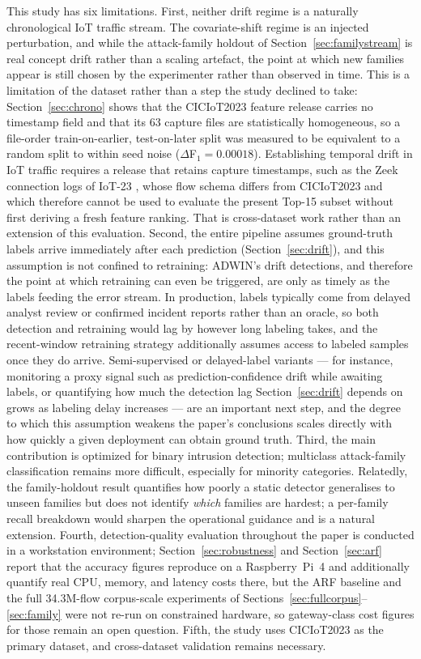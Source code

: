 \documentclass[11pt,a4paper]{article}
\begin{document}
This study has six limitations. First, neither drift regime is a naturally
chronological IoT traffic stream. The covariate-shift regime is an injected
perturbation, and while the attack-family holdout of
Section~\ref{sec:familystream} is real concept drift rather than a scaling
artefact, the point at which new families appear is still chosen by the
experimenter rather than observed in time. This is a limitation of the dataset
rather than a step the study declined to take:
Section~\ref{sec:chrono} shows that the CICIoT2023 feature release carries no
timestamp field and that its 63 capture files are statistically homogeneous, so
a file-order train-on-earlier, test-on-later split was measured to be
equivalent to a random split to within seed noise
($\Delta$F$_1 = 0.00018$). Establishing temporal drift in IoT traffic requires
a release that retains capture timestamps, such as the Zeek connection logs of
IoT-23 \cite{garcia2020iot23}, whose flow schema differs from CICIoT2023 and
which therefore cannot be used to evaluate the present Top-15 subset without
first deriving a fresh feature ranking. That is cross-dataset work rather than
an extension of this evaluation. Second, the entire pipeline assumes
ground-truth labels arrive immediately after each prediction
(Section~\ref{sec:drift}), and this assumption is not confined to
retraining: ADWIN's drift detections, and therefore the point at which
retraining can even be triggered, are only as timely as the labels
feeding the error stream. In production, labels typically come from
delayed analyst review or confirmed incident reports rather than an
oracle, so both detection and retraining would lag by however long
labeling takes, and the recent-window retraining strategy additionally
assumes access to labeled samples once they do arrive. Semi-supervised
or delayed-label variants --- for instance, monitoring a proxy signal
such as prediction-confidence drift while awaiting labels, or
quantifying how much the detection lag Section~\ref{sec:drift} depends
on grows as labeling delay increases --- are an important next step,
and the degree to which this assumption weakens the paper's
conclusions scales directly with how quickly a given deployment can
obtain ground truth.
Third, the main contribution is optimized for binary intrusion
detection; multiclass attack-family classification remains more
difficult, especially for minority categories. Relatedly, the family-holdout
result quantifies how poorly a static detector generalises to unseen families
but does not identify \emph{which} families are hardest; a per-family recall
breakdown would sharpen the operational guidance and is a natural extension. Fourth, detection-quality
evaluation throughout the paper is conducted in a workstation environment;
Section~\ref{sec:robustness} and Section~\ref{sec:arf} report that the
accuracy figures reproduce on a Raspberry~Pi~4 and additionally quantify
real CPU, memory, and latency costs there, but the ARF baseline and the
full 34.3M-flow corpus-scale experiments of
Sections~\ref{sec:fullcorpus}--\ref{sec:family} were not re-run on
constrained hardware, so gateway-class cost figures for those remain an
open question. Fifth, the study uses CICIoT2023 as the primary dataset, and
cross-dataset validation remains necessary.
\end{document}
